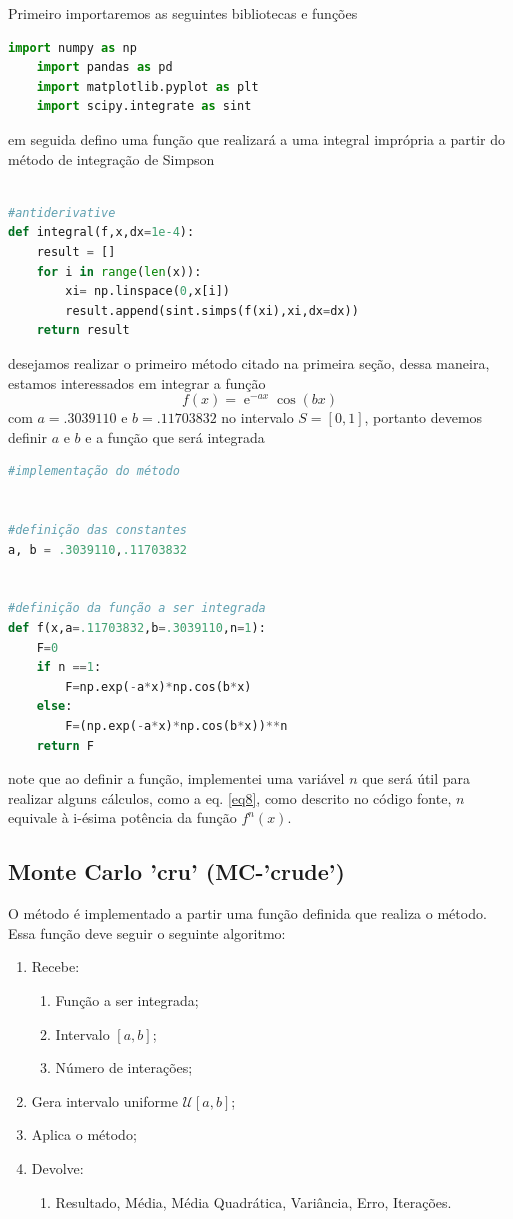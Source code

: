 \documentclass{article}
\DeclareMathOperator{\e}{\mathrm{e}}
\begin{document}
Primeiro importaremos as seguintes bibliotecas e funções
\begin{lstlisting}[language=Python]
    import numpy as np
    import pandas as pd
    import matplotlib.pyplot as plt
    import scipy.integrate as sint
\end{lstlisting}
em seguida defino uma função que realizará a uma integral imprópria a partir do método de integração de Simpson
\begin{lstlisting}[language=Python]

#antiderivative
def integral(f,x,dx=1e-4):
	result = []
	for i in range(len(x)):
		xi=	np.linspace(0,x[i])
		result.append(sint.simps(f(xi),xi,dx=dx))
	return result
\end{lstlisting}
desejamos realizar o primeiro método citado na primeira seção, dessa maneira, estamos interessados em integrar a função $$f(x)=\e^{-ax}\cos(bx)$$ com $a=.3039110$ e $b=.11703832$ no intervalo $S=\left[0,1\right]$, portanto devemos definir $a$ e $b$ e a função que será integrada
\begin{lstlisting}[language=Python]
#implementação do método


#definição das constantes
a, b = .3039110,.11703832


#definição da função a ser integrada
def f(x,a=.11703832,b=.3039110,n=1):
	F=0
	if n ==1:
		F=np.exp(-a*x)*np.cos(b*x)
	else:
		F=(np.exp(-a*x)*np.cos(b*x))**n
	return F
\end{lstlisting}
note que ao definir a função, implementei uma variável $n$ que será útil para realizar alguns cálculos, como a eq. \ref{eq8}, como descrito no código fonte, $n$ equivale à i-ésima potência da função $f^n(x)$.

\subsection{Monte Carlo 'cru' (MC-'crude')}

O método é implementado a partir uma função definida que realiza o método. Essa função deve seguir o seguinte algoritmo:
\begin{multicols}{2}
\begin{enumerate}
    \item Recebe:
    \begin{enumerate}
        \item Função a ser integrada;
        \item Intervalo $[a,b]$;
        \item Número de interações;
    \end{enumerate}
    \item Gera intervalo uniforme $\mathcal{U}[a,b]$;
    \item Aplica o método;
    \item Devolve:
    \begin{enumerate}
        \item Resultado, Média, Média Quadrática, Variância, Erro, Iterações.
    \end{enumerate}
\end{enumerate}
\end{multicols}
\end{document}
